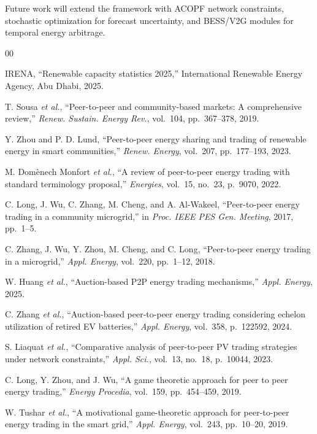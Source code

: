 \documentclass[conference]{IEEEtran}
\begin{document}
Future work will extend the framework with ACOPF network constraints, stochastic optimization for forecast uncertainty, and BESS/V2G modules for temporal energy arbitrage.

\vfill\eject


{\footnotesize
\begin{thebibliography}{00}

IRENA, ``Renewable capacity statistics 2025,'' International Renewable Energy Agency, Abu Dhabi, 2025.

T. Sousa \textit{et al.}, ``Peer-to-peer and community-based markets: A comprehensive review,'' \textit{Renew. Sustain. Energy Rev.}, vol.~104, pp.~367--378, 2019.

Y. Zhou and P. D. Lund, ``Peer-to-peer energy sharing and trading of renewable energy in smart communities,'' \textit{Renew. Energy}, vol.~207, pp.~177--193, 2023.

M. Dom\`{e}nech Monfort \textit{et al.}, ``A review of peer-to-peer energy trading with standard terminology proposal,'' \textit{Energies}, vol.~15, no.~23, p.~9070, 2022.

C. Long, J. Wu, C. Zhang, M. Cheng, and A. Al-Wakeel, ``Peer-to-peer energy trading in a community microgrid,'' in \textit{Proc. IEEE PES Gen. Meeting}, 2017, pp.~1--5.

C. Zhang, J. Wu, Y. Zhou, M. Cheng, and C. Long, ``Peer-to-peer energy trading in a microgrid,'' \textit{Appl. Energy}, vol.~220, pp.~1--12, 2018.

W. Huang \textit{et al.}, ``Auction-based P2P energy trading mechanisms,'' \textit{Appl. Energy}, 2025.

C. Zhang \textit{et al.}, ``Auction-based peer-to-peer energy trading considering echelon utilization of retired EV batteries,'' \textit{Appl. Energy}, vol.~358, p.~122592, 2024.

S. Liaquat \textit{et al.}, ``Comparative analysis of peer-to-peer PV trading strategies under network constraints,'' \textit{Appl. Sci.}, vol.~13, no.~18, p.~10044, 2023.

C. Long, Y. Zhou, and J. Wu, ``A game theoretic approach for peer to peer energy trading,'' \textit{Energy Procedia}, vol.~159, pp.~454--459, 2019.

W. Tushar \textit{et al.}, ``A motivational game-theoretic approach for peer-to-peer energy trading in the smart grid,'' \textit{Appl. Energy}, vol.~243, pp.~10--20, 2019.


\end{thebibliography}}
\end{document}
